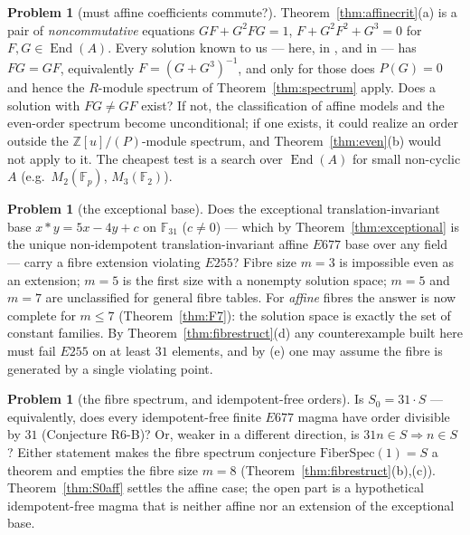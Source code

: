 \documentclass[11pt]{article}
\theoremstyle{plain}
\theoremstyle{definition}
\newtheorem{problem}[theorem]{Problem}
\theoremstyle{remark}
\numberwithin{equation}{section}
\newcommand{\Z}{\mathbb{Z}}
\newcommand{\F}{\mathbb{F}}
\newcommand{\op}{\mathbin{*}}
\newcommand{\End}{\operatorname{End}}
\begin{document}
\begin{problem}[must affine coefficients commute?]\label{prob:noncommuting}
Theorem~\ref{thm:affinecrit}(a) is a pair of \emph{noncommutative} equations
$GF+G^2FG = 1$, $F+G^2F^2+G^3 = 0$ for $F,G\in\End(A)$. Every solution known to us --- here,
in \cite{blueprint}, and in \cite{icarm} --- has $FG = GF$, equivalently
$F = (G+G^3)^{-1}$, and only for those does $P(G)=0$ and hence the $R$-module spectrum of
Theorem~\ref{thm:spectrum} apply. Does a solution with $FG\ne GF$ exist? If not, the
classification of affine models and the even-order spectrum become unconditional; if one
exists, it could realize an order outside the $\Z[u]/(P)$-module spectrum, and
Theorem~\ref{thm:even}(b) would not apply to it. The cheapest test is a search over
$\End(A)$ for small non-cyclic $A$ (e.g.\ $M_2(\F_p)$, $M_3(\F_2)$).
\end{problem}

\begin{problem}[the exceptional base]
Does the exceptional translation-invariant base $x\op y = 5x-4y+c$ on $\F_{31}$ ($c\ne0$)
--- which by Theorem~\ref{thm:exceptional} is the unique non-idempotent
translation-invariant affine $E677$ base over any field --- carry a fibre extension
violating $E255$? Fibre size
$m=3$ is impossible even as an extension; $m=5$ is the first size with a nonempty solution
space; $m=5$ and $m=7$ are unclassified for general fibre tables. For \emph{affine} fibres
the answer is now complete for $m\le7$ (Theorem~\ref{thm:F7}): the solution space is exactly
the set of constant families. By Theorem~\ref{thm:fibrestruct}(d) any counterexample built
here must fail $E255$ on at least $31$ elements, and by (e) one may assume the fibre is
generated by a single violating point.
\end{problem}

\begin{problem}[the fibre spectrum, and idempotent-free orders]\label{prob:S0}
Is $S_0 = 31\cdot S$ --- equivalently, does every idempotent-free finite $E677$ magma have
order divisible by $31$ (Conjecture R6-B)? Or, weaker in a different direction, is
$31n\in S\Rightarrow n\in S$? Either statement makes the fibre spectrum conjecture
$\mathrm{FiberSpec}(1) = S$ a theorem and empties the fibre size $m = 8$
(Theorem~\ref{thm:fibrestruct}(b),(c)). Theorem~\ref{thm:S0aff} settles the affine case;
the open part is a hypothetical idempotent-free magma that is neither affine nor an
extension of the exceptional base.
\end{problem}
\end{document}
